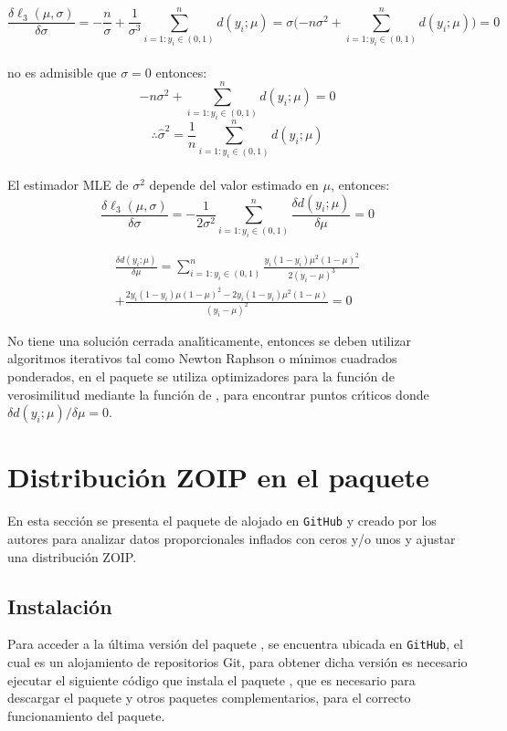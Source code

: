 \begin{enumerate}
\[
\frac{\delta \ell_3(\mu,\sigma)}{\delta \sigma}=-\frac{n}{\sigma}+\frac{1}{\sigma^3}\sum_{i=1:y_i \in (0,1)}^{n}{d(y_i;\mu)}=\sigma(-n\sigma^2+\sum_{i=1:y_i \in (0,1)}^{n}{d(y_i;\mu))}=0
\]
\\
no es admisible que $\sigma=0$ entonces:
\[
-n\sigma^2+\sum_{i=1:y_i \in (0,1)}^{n}{d(y_i;\mu)}=0
\]
\[
\therefore \hat{\sigma}^2=\frac{1}{n}\sum_{i=1:y_i \in (0,1)}^{n}{d(y_i;\mu)}
\]
\\
El estimador MLE de $\sigma^2$ depende del valor estimado en $\mu$, entonces:
\[
\frac{\delta \ell_3(\mu,\sigma)}{\delta \sigma}=-\frac{1}{2\sigma^2}\sum_{i=1:y_i \in (0,1)}^{n}{\frac{\delta d(y_i;\mu)}{\delta\mu}}=0
\]

\begin{multline*}
\frac{\delta d(y_i;\mu)}{\delta\mu}=\sum_{i=1:y_i \in (0,1)}^{n}\frac{y_i(1-y_i)\mu^2(1-\mu)^2}{2(y_i-\mu)^3}\\
+\frac{2y_i(1-y_i)\mu(1-\mu)^2-2y_i(1-y_i)\mu^2(1-\mu)}{(y_i-\mu)^2}=0
\end{multline*}

No tiene una soluci\'{o}n cerrada anal\'{\i}ticamente, entonces se deben utilizar algoritmos iterativos tal como Newton Raphson o m\'{\i}nimos cuadrados ponderados, en el paquete  se utiliza optimizadores para la funci\'{o}n de verosimilitud mediante la funci\'{o}n  de , para encontrar puntos cr\'{\i}ticos donde ${\delta d(y_i;\mu)}/{\delta\mu}=0$.

\end{enumerate}



\section{Distribuci\'{o}n ZOIP en el paquete }

En esta secci\'{o}n se presenta el paquete  de  alojado en \verb|GitHub| y creado por los autores para analizar datos proporcionales inflados con ceros y/o unos y ajustar una distribuci\'{o}n ZOIP.

\subsection{Instalaci\'{o}n}

Para acceder a la \'{u}ltima versi\'{o}n del paquete , se encuentra ubicada en \verb|GitHub|, el cual es un alojamiento de repositorios Git, para obtener dicha versi\'{o}n es necesario ejecutar el siguiente c\'{o}digo que instala el paquete , que es necesario para descargar el paquete  y otros paquetes complementarios, para el correcto funcionamiento del paquete.


